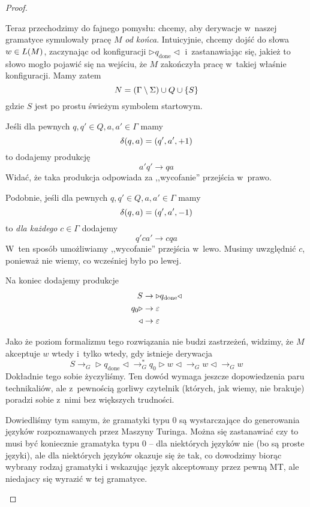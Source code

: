 \begin{proof}
\begin{itemize}
            Teraz przechodzimy do fajnego pomysłu: chcemy, aby derywacje w~naszej gramatyce symulowały pracę \(M\) \emph{od końca}. Intuicyjnie, chcemy dojść do słowa \(w \in L\pars{M}\), zaczynając od konfiguracji \(\triangleright q_\textrm{done}\triangleleft\) i~zastanawiając się, jakież to słowo mogło pojawić się na wejściu, że \(M\) zakończyła pracę w~takiej właśnie konfiguracji. Mamy zatem
            \[
                N = \pars{\Gamma \setminus \Sigma} \cup Q \cup \set{S}
            \]
            gdzie \(S\) jest po prostu świeżym symbolem startowym.
            
            Jeśli dla pewnych \(q, q' \in Q, a, a' \in \Gamma\) mamy
            \[
                \delta\pars{q, a} = \pars{q', a', +1}
            \]
            to dodajemy produkcję
            \[
                a'q' \rightarrow qa
            \]
            Widać, że taka produkcja odpowiada za ,,wycofanie'' przejścia w~prawo.
            
            Podobnie, jeśli dla pewnych \(q, q' \in Q, a, a' \in \Gamma\) mamy
            \[
                \delta\pars{q, a} = \pars{q', a', -1}
            \]
            to \emph{dla każdego} \(c \in \Gamma\) dodajemy
            \[
                q'ca' \rightarrow cqa
            \]
            W~ten sposób umożliwiamy ,,wycofanie'' przejścia w~lewo. Musimy uwzględnić \(c\), ponieważ nie wiemy, co wcześniej było po lewej.
            
            Na koniec dodajemy produkcje
            \begin{align*}
                S &\rightarrow \triangleright q_\textrm{done}\triangleleft\\
                q_0\triangleright &\rightarrow \varepsilon\\
                \triangleleft &\rightarrow \varepsilon
            \end{align*}
            
            Jako że poziom formalizmu tego rozwiązania nie budzi zastrzeżeń, widzimy, że \(M\) akceptuje \(w\) wtedy i~tylko wtedy, gdy istnieje derywacja
            \[
                S \rightarrow_G \triangleright q_\textrm{done} \triangleleft \rightarrow_G^* q_0\triangleright w\triangleleft \rightarrow_G w\triangleleft \rightarrow_G w
            \]
            Dokładnie tego sobie życzyliśmy. Ten dowód wymaga jeszcze dopowiedzenia paru technikaliów, ale z~pewnością gorliwy czytelnik (których, jak wiemy, nie brakuje) poradzi sobie z~nimi bez większych trudności.
            
            Dowiedliśmy tym samym, że gramatyki typu 0 są wystarczające do generowania języków rozpoznawanych przez Maszyny Turinga.
            Można się zastanawiać czy to musi być koniecznie gramatyka typu 0 -- dla niektórych języków nie (bo są proste języki), ale dla niektórych języków okazuje się że tak, co dowodzimy biorąc wybrany rodzaj gramatyki i wskazując język akceptowany przez pewną MT, ale niedajacy się wyrazić w tej gramatyce.
            
            
    \end{itemize}
\end{proof}
